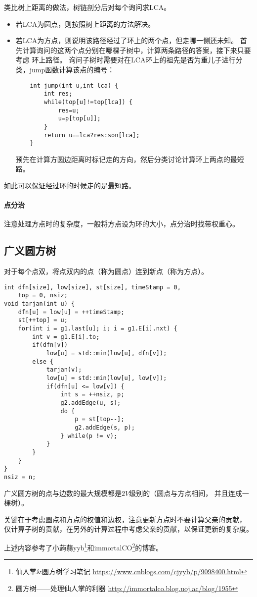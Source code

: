 类比树上距离的做法，树链剖分后对每个询问求LCA。
\begin{itemize}
    \item 若LCA为圆点，则按照树上距离的方法解决。
    \item 若LCA为方点，则说明该路径经过了环上的两个点，但走哪一侧还未知。
    首先计算询问的这两个点分别在哪棵子树中，计算两条路径的答案，接下来只要考虑
    环上路径。
    询问子树时需要对在LCA环上的祖先是否为重儿子进行分类，jump函数计算该点的编号：
    \begin{lstlisting}
    int jump(int u,int lca) {
        int res;
        while(top[u]!=top[lca]) {
            res=u;
            u=p[top[u]];
        }
        return u==lca?res:son[lca];
    }
    \end{lstlisting}
    预先在计算方圆边距离时标记走的方向，然后分类讨论计算环上两点的最短路。
\end{itemize}
如此可以保证经过环的时候走的是最短路。
\paragraph{点分治}
注意处理方点时的复杂度，一般将方点设为环的大小，点分治时找带权重心。
\subsection{广义圆方树}
对于每个点双，将点双内的点（称为圆点）连到新点（称为方点）。
\begin{lstlisting}
int dfn[size], low[size], st[size], timeStamp = 0,
    top = 0, nsiz;
void tarjan(int u) {
    dfn[u] = low[u] = ++timeStamp;
    st[++top] = u;
    for(int i = g1.last[u]; i; i = g1.E[i].nxt) {
        int v = g1.E[i].to;
        if(dfn[v])
            low[u] = std::min(low[u], dfn[v]);
        else {
            tarjan(v);
            low[u] = std::min(low[u], low[v]);
            if(dfn[u] <= low[v]) {
                int s = ++nsiz, p;
                g2.addEdge(u, s);
                do {
                    p = st[top--];
                    g2.addEdge(s, p);
                } while(p != v);
            }
        }
    }
}
nsiz = n;
\end{lstlisting}
广义圆方树的点与边数的最大规模都是$2V$级别的（圆点与方点相间，
并且连成一棵树）。

关键在于考虑圆点和方点的权值和边权，注意更新方点时不要计算父亲的贡献，
仅计算子树的贡献，在另外的计算过程中考虑父亲的贡献，以保证更新的复杂度。

上述内容参考了小蒟蒻yyb\footnote{仙人掌\&圆方树学习笔记
    \url{https://www.cnblogs.com/cjyyb/p/9098400.html}
}和immortalCO\footnote{圆方树——处理仙人掌的利器
    \url{http://immortalco.blog.uoj.ac/blog/1955}
}的博客。
